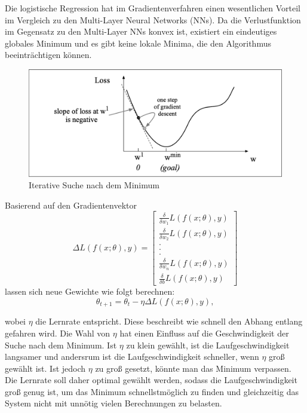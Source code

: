 Die logistische Regression hat im Gradientenverfahren einen wesentlichen Vorteil im Vergleich zu den Multi-Layer Neural Networks (NNs). Da die Verlustfunktion im Gegensatz zu den Multi-Layer NNs konvex ist, existiert ein eindeutiges globales Minimum und es gibt keine lokale Minima, die den Algorithmus beeinträchtigen können.

\begin{figure}[H]
\centering
\includegraphics[width=0.5\linewidth]{pic/Klassifikation/MinimumSuche.png}
\caption{\label{pic:MinimumSuche} Iterative Suche nach dem Minimum}
\end{figure}


Basierend auf den Gradientenvektor 
\begin{equation}
\Delta L (f(x;\theta),y) = \begin{bmatrix}  \frac{\delta}{\delta w_{1}} L (f(x;\theta),y) \\ 
 \frac{\delta}{\delta w_{2}} L (f(x;\theta),y) \\ 
. \\ 
. \\ 
. \\ 
  \frac{\delta}{\delta w_{n}} L (f(x;\theta),y) \\ 
   \frac{\delta}{\delta b} L (f(x;\theta),y) \end{bmatrix} \label{Gradientenvektor}
\end{equation}
lassen sich neue Gewichte wie folgt berechnen:
\begin{equation}
\theta_{t+1} = \theta_{t} - \eta \Delta L (f(x;\theta),y),  \label{neue Gewichte}
\end{equation}

wobei $\eta$ die Lernrate entspricht. Diese beschreibt wie schnell den Abhang entlang gefahren wird. Die Wahl von $\eta$ hat einen Einfluss auf die Geschwindigkeit der Suche nach dem Minimum. Ist $\eta$ zu klein gewählt, ist die Laufgeschwindigkeit langsamer und andersrum ist die Laufgeschwindigkeit schneller, wenn $\eta$ groß gewählt ist. Ist jedoch $\eta$ zu groß gesetzt, könnte man das Minimum verpassen. Die Lernrate soll daher optimal gewählt werden, sodass die Laufgeschwindigkeit groß genug ist, um das Minimum schnellstmöglich zu finden und gleichzeitig das System nicht mit unnötig vielen Berechnungen zu belasten.

